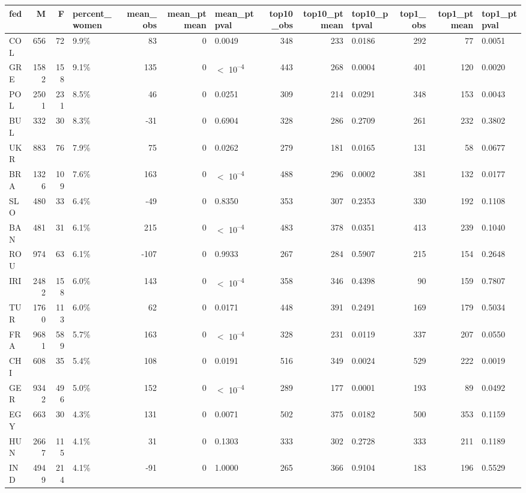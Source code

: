
\begin{tabular}{l|r|r|l|r|r|l|r|r|l|r|r|l}
\hline
fed & M & F & percent_women & mean_obs & mean_ptmean & mean_ptpval & top10_obs & top10_ptmean & top10_ptpval & top1_obs & top1_ptmean & top1_ptpval\\
\hline
COL & 656 & 72 & 9.9\% & 83 & 0 & 0.0049 & 348 & 233 & 0.0186 & 292 & 77 & 0.0051\\
\hline
GRE & 1582 & 158 & 9.1\% & 135 & 0 & $<$ 10\textsuperscript{--4} & 443 & 268 & 0.0004 & 401 & 120 & 0.0020\\
\hline
POL & 2501 & 231 & 8.5\% & 46 & 0 & 0.0251 & 309 & 214 & 0.0291 & 348 & 153 & 0.0043\\
\hline
BUL & 332 & 30 & 8.3\% & -31 & 0 & 0.6904 & 328 & 286 & 0.2709 & 261 & 232 & 0.3802\\
\hline
UKR & 883 & 76 & 7.9\% & 75 & 0 & 0.0262 & 279 & 181 & 0.0165 & 131 & 58 & 0.0677\\
\hline
BRA & 1326 & 109 & 7.6\% & 163 & 0 & $<$ 10\textsuperscript{--4} & 488 & 296 & 0.0002 & 381 & 132 & 0.0177\\
\hline
SLO & 480 & 33 & 6.4\% & -49 & 0 & 0.8350 & 353 & 307 & 0.2353 & 330 & 192 & 0.1108\\
\hline
BAN & 481 & 31 & 6.1\% & 215 & 0 & $<$ 10\textsuperscript{--4} & 483 & 378 & 0.0351 & 413 & 239 & 0.1040\\
\hline
ROU & 974 & 63 & 6.1\% & -107 & 0 & 0.9933 & 267 & 284 & 0.5907 & 215 & 154 & 0.2648\\
\hline
IRI & 2482 & 158 & 6.0\% & 143 & 0 & $<$ 10\textsuperscript{--4} & 358 & 346 & 0.4398 & 90 & 159 & 0.7807\\
\hline
TUR & 1760 & 113 & 6.0\% & 62 & 0 & 0.0171 & 448 & 391 & 0.2491 & 169 & 179 & 0.5034\\
\hline
FRA & 9681 & 589 & 5.7\% & 163 & 0 & $<$ 10\textsuperscript{--4} & 328 & 231 & 0.0119 & 337 & 207 & 0.0550\\
\hline
CHI & 608 & 35 & 5.4\% & 108 & 0 & 0.0191 & 516 & 349 & 0.0024 & 529 & 222 & 0.0019\\
\hline
GER & 9342 & 496 & 5.0\% & 152 & 0 & $<$ 10\textsuperscript{--4} & 289 & 177 & 0.0001 & 193 & 89 & 0.0492\\
\hline
EGY & 663 & 30 & 4.3\% & 131 & 0 & 0.0071 & 502 & 375 & 0.0182 & 500 & 353 & 0.1159\\
\hline
HUN & 2667 & 115 & 4.1\% & 31 & 0 & 0.1303 & 333 & 302 & 0.2728 & 333 & 211 & 0.1189\\
\hline
IND & 4949 & 214 & 4.1\% & -91 & 0 & 1.0000 & 265 & 366 & 0.9104 & 183 & 196 & 0.5529\\

\end{tabular}
